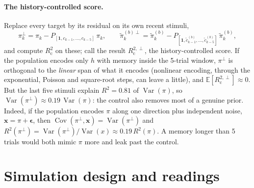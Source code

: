 \documentclass[11pt]{article}
\newcommand{\E}{\mathbb{E}}
\newcommand{\Var}{\operatorname{Var}}
\newcommand{\Cov}{\operatorname{Cov}}
\newcommand{\Rc}{R^2_{\mathrm{c}}}
\begin{document}
\paragraph{The history-controlled score.} Replace every target by its residual on its own recent stimuli,
\begin{equation}
\pi^{\perp}_k = \pi_k - P_{[\bm 1, c_{k-1}, \dots, c_{k-5}]}\,\pi_k, \qquad
\tilde\pi^{(b)\perp}_k = \tilde\pi^{(b)}_k - P_{[\bm 1, \tilde c^{(b)}_{k-1}, \dots, \tilde c^{(b)}_{k-5}]}\,\tilde\pi^{(b)}_k,
\end{equation}
and compute $\Rc$ on these; call the result $R^{2,\perp}_{\mathrm{c}}$, the history-controlled score. If the population
encodes only $h$ with memory inside the 5-trial window, $\pi^\perp$ is orthogonal to the \emph{linear} span of what it
encodes (nonlinear encoding, through the exponential, Poisson and square-root steps, can leave a little), and
$\E[R^{2,\perp}_{\mathrm{c}}] \approx 0$. But the last five stimuli explain $R^2 = 0.81$ of $\Var(\pi)$, so
$\Var(\pi^\perp) \approx 0.19\,\Var(\pi)$: the control also removes most of a genuine prior. Indeed, if the population
encodes $\pi$ along one direction plus independent noise, $\bm x = \pi + \bm\epsilon$, then
$\Cov(\pi^\perp, \bm x) = \Var(\pi^\perp)$ and $R^2(\pi^\perp) = \Var(\pi^\perp)/\Var(x) \approx 0.19\,R^2(\pi)$. A memory
longer than 5 trials would both mimic $\pi$ more and leak past the control.

\section{Simulation design and readings}
\end{document}
